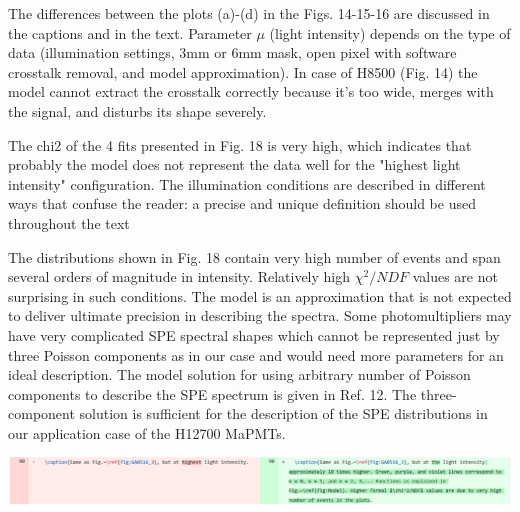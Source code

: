 \documentclass[11pt]{report}
\begin{document}
The differences between the plots (a)-(d) in the Figs. 14-15-16 are discussed in the captions and in the text.
Parameter $\mu$ (light intensity) depends on the type of data (illumination settings, 3mm or 6mm mask, open pixel with software crosstalk removal, and model approximation).
In case of H8500 (Fig. 14) the model cannot extract the crosstalk correctly because it's too wide, merges with the signal, and disturbs its shape severely.



\begin{tcolorbox}[enlarge top by=2em,colbacktitle=black!60!white,colframe=black!80!white,left=0pt,right=0pt,top=0pt,bottom=0pt,boxrule=0.3pt,title=\bfseries2.08]
The chi2 of the 4 fits presented in Fig. 18 is very high, which indicates that probably the model does not represent the data well for the "highest light intensity" configuration. The illumination conditions are described in different ways that confuse the reader: a precise and unique definition should be used throughout the text
\end{tcolorbox}

 The distributions shown in Fig. 18 contain very high number of events and span several orders of magnitude in intensity. Relatively high $\chi^2/NDF$ values are not surprising in such conditions. The model is an approximation that is not expected to deliver ultimate precision in describing the spectra. Some photomultipliers may have very complicated SPE spectral shapes which cannot be represented just by three Poisson components as in our case and would need more parameters for an ideal description. The model solution for using arbitrary number of Poisson components to describe the SPE spectrum is given in Ref. 12. The three-component solution is sufficient for the description of the SPE distributions in our application case of the H12700 MaPMTs.
 


\includegraphics[width=\linewidth]{round1/2.08.png}
\end{document}
